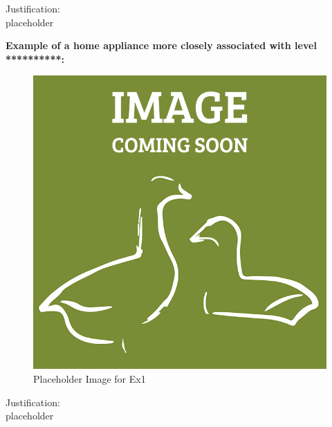 \documentclass[a4paper,11pt,oneside]{scrreprt}
\begin{document}
\noindent Justification:\\
placeholder

\vspace{5mm}

\textbf{Example of a home appliance more closely associated with level **********:}

\begin{figure}[H]
	\centering
	\includegraphics[clip, trim=0cm 0cm 0cm 0cm, scale=0.33]{./images/redesign.png}
	\caption{Placeholder Image for Ex1}
\end{figure}

\noindent Justification:\\
placeholder
\end{document}
